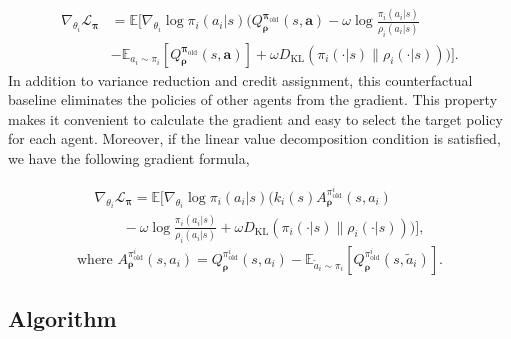\documentclass{article}
\begin{document}
\fi
\begin{equation*}
	\begin{split}
		 \nabla_{\theta_i} \mathcal{L}_{\bm{\pi}} 
		& = \mathbb{E} \bigg[  \nabla_{\theta_i} \log\pi_i(a_i|s) ( Q^{{\bm{\pi}}_{\operatorname{old}}}_{\bm{\rho}}(s,\bm{a})  - \omega \log \frac{\pi_i(a_i|s)}{\rho_i(a_i|s)} \\
		& - \mathbb{E}_{a_i \sim \pi_i} [ Q^{{\bm{\pi}}_{\operatorname{old}}}_{\bm{\rho}}(s,\bm{a})] + \omega D_{\operatorname{KL}}(\pi_i(\cdot|s) \| \rho_i(\cdot|s)) ) \bigg]. \label{pg-final}
	\end{split}
\end{equation*}
In addition to variance reduction and credit assignment, this counterfactual baseline eliminates the policies of other agents from the gradient. This property makes it convenient to calculate the gradient and easy to select the target policy for each agent. Moreover, if the linear value decomposition condition is satisfied, we have the following gradient formula,
\iffalse
\begin{equation}
	\nabla_{\theta_i} \mathcal{L}_{\bm{\pi}}  = \mathbb{E}[  \nabla_{\theta_i} \log\pi_i(a_i|s) ( k_i(s) A^{{\pi_i}}_{\bm{\rho}}(s,a_i)  - \omega \log \frac{\pi_i(a_i|s)}{\rho_i(a_i|s)} 
	+ \omega D_{\operatorname{KL}}(\pi_i(\cdot|s) \| \rho_i(\cdot|s)) ) ],
\end{equation}
\fi
\begin{multline*}
	\nabla_{\theta_i} \mathcal{L}_{\bm{\pi}}  = \mathbb{E}\bigg[  \nabla_{\theta_i} \log\pi_i(a_i|s) \big( k_i(s) A^{{\pi^i_{\operatorname{old}}}}_{\bm{\rho}}(s,a_i) \\
	\qquad - \omega \log \frac{\pi_i(a_i|s)}{\rho_i(a_i|s)} 
	+ \omega D_{\operatorname{KL}}(\pi_i(\cdot|s) \| \rho_i(\cdot|s)) \big) \bigg],
\end{multline*}
\[
\text{where } A^{\pi^i_{\operatorname{old}}}_{\bm{\rho}}(s,a_i) = Q^{\pi^i_{\operatorname{old}}}_{\bm{\rho}}(s,a_i) - \mathbb{E}_{\tilde{a}_i \sim \pi_i} \left[ Q^{\pi^i_{\operatorname{old}}}_{\bm{\rho}}(s,\tilde{a}_i)\right].
\]



\subsection{Algorithm}
\end{document}
